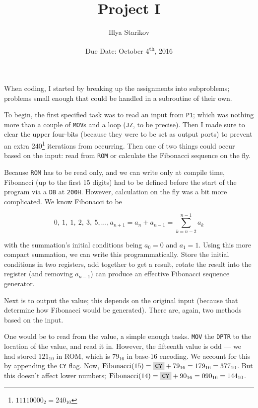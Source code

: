 \documentclass[12pt]{article}
\title{Project I}
\date{Due Date: October 4\textsuperscript{th}, 2016}
\author{Illya Starikov}
\newcommand{\shellcmd}[1]{\texttt{\colorbox{gray!30}{#1}}}
\begin{document}
\maketitle

When coding, I started by breaking up the assignments into subproblems; problems small enough that could be handled in a subroutine of their own.

To begin, the first specified task was to read an input from \texttt{P1}; which was nothing more than a couple of \shellcmd{MOV}s and a loop (\shellcmd{JZ}, to be precise). Then I made sure to clear the upper four-bits (because they were to be set as output ports) to prevent an extra 240\footnote{$11110000_2 = 240_{10}$} iterations from occurring. Then one of two things could occur based on the input: read from \texttt{ROM} or calculate the Fibonacci sequence on the fly.

Because \texttt{ROM} has to be read only, and we can write only at compile time, Fibonacci (up to the first 15 digits) had to be defined before the start of the program via a \shellcmd{DB} at \shellcmd{200H}. However, calculation on the fly was a bit more complicated. We know Fibonacci to be

\begin{equation}
    0,\ 1,\ 1,\ 2,\ 3,\ 5, \ldots, a_{n + 1} = a_n + a_{n - 1} = \sum _{k = n - 2} ^{n - 1} a_k
\end{equation}

\noindent with the summation's initial conditions being $a_0 = 0$ and $a_1 = 1$. Using this more compact summation, we can write this programmatically. Store the initial conditions in two registers, add together to get a result, rotate the result into the register (and removing $a_{n - 1}$) can produce an effective Fibonacci sequence generator.

Next is to output the value; this depends on the original input (because that determine how Fibonacci would be generated). There are, again, two methods based on the input.

One would be to read from the value, a simple enough tasks. \shellcmd{MOV} the \shellcmd{DPTR} to the location of the value, and read it in. However, the fifteenth value is odd --- we had stored $121_{10}$ in ROM, which is $79_{16}$ in base-16 encoding. We account for this by appending the \shellcmd{CY} flag. Now, $\text{Fibonacci}(15) = \shellcmd{CY} + 79_{16} = 179_{16} = 377_{10}$. But this doesn't affect lower numbers; $\text{Fibonacci}(14) = \shellcmd{CY} + 90_{16} = 090_{16} = 144_{10}$.
\end{document}

